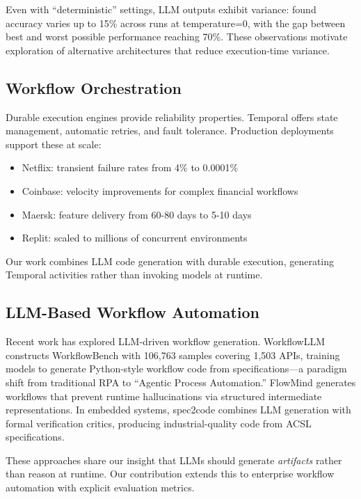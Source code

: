 \documentclass[11pt]{article}
\begin{document}
Even with ``deterministic'' settings, LLM outputs exhibit variance: \citet{atil2024nondeterminism} found accuracy varies up to 15\% across runs at temperature=0, with the gap between best and worst possible performance reaching 70\%. These observations motivate exploration of alternative architectures that reduce execution-time variance.

\subsection{Workflow Orchestration}

Durable execution engines provide reliability properties. Temporal \citep{temporal2024} offers state management, automatic retries, and fault tolerance. Production deployments support these at scale:
\begin{itemize}
    \item Netflix: transient failure rates from 4\% to 0.0001\%
    \item Coinbase: velocity improvements for complex financial workflows
    \item Maersk: feature delivery from 60-80 days to 5-10 days
    \item Replit: scaled to millions of concurrent environments
\end{itemize}

Our work combines LLM code generation with durable execution, generating Temporal activities rather than invoking models at runtime.

\subsection{LLM-Based Workflow Automation}

Recent work has explored LLM-driven workflow generation. WorkflowLLM \citep{fan2024workflowllm} constructs WorkflowBench with 106,763 samples covering 1,503 APIs, training models to generate Python-style workflow code from specifications---a paradigm shift from traditional RPA to ``Agentic Process Automation.'' FlowMind \citep{zeng2024flowmind} generates workflows that prevent runtime hallucinations via structured intermediate representations. In embedded systems, spec2code \citep{patil2024spec2code} combines LLM generation with formal verification critics, producing industrial-quality code from ACSL specifications.

These approaches share our insight that LLMs should generate \textit{artifacts} rather than reason at runtime. Our contribution extends this to enterprise workflow automation with explicit evaluation metrics.
\end{document}
